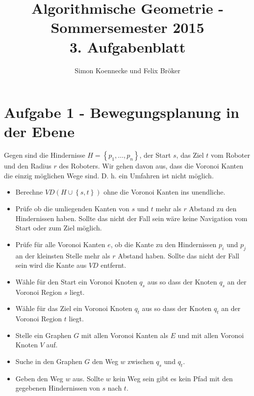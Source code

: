 \documentclass[a4paper]{article}
\begin{document}
\title{Algorithmische Geometrie - Sommersemester 2015\\
       3. Aufgabenblatt }
\author{Simon Koennecke und Felix Bröker}
\date{}
\maketitle

\section*{Aufgabe 1 - Bewegungsplanung in der Ebene}

Gegen sind die Hindernisse $H = \left\{p_1, \dots, p_n\right\}$, der Start $s$, das Ziel $t$ vom Roboter und den Radius $r$ des Roboters. Wir gehen davon aus, dass die Voronoi Kanten die einzig möglichen Wege sind. D. h. ein Umfahren ist nicht möglich.

\begin{itemize}

\item Berechne $VD(H \cup \left\{s,t\right\})$ ohne die Voronoi Kanten ins unendliche.

\item Prüfe ob die umliegenden Kanten von $s$ und $t$ mehr als $r$ Abstand zu den Hindernissen haben. Sollte das nicht der Fall sein wäre keine Navigation vom Start oder zum Ziel möglich.

\item Prüfe für alle Voronoi Kanten $e$, ob die Kante zu den Hindernissen $p_i$ und $p_j$ an der kleinsten Stelle mehr als $r$ Abstand haben. Sollte das nicht der Fall sein wird die Kante aus $VD$ entfernt.

\item Wähle für den Start ein Voronoi Knoten $q_s$ aus so dass der Knoten $q_s$ an der Voronoi Region $s$ liegt.

\item Wähle für das Ziel ein Voronoi Knoten $q_t$ aus so dass der Knoten $q_t$ an der Voronoi Region $t$ liegt.

\item Stelle ein Graphen $G$ mit allen Voronoi Kanten als $E$ und mit allen Voronoi Knoten $V$ auf.

\item Suche in den Graphen $G$ den Weg $w$ zwischen $q_s$ und $q_t$.

\item Geben den Weg $w$ aus. Sollte $w$ kein Weg sein gibt es kein Pfad mit den gegebenen Hindernissen von $s$ nach $t$.

\end{itemize}  
\end{document}
